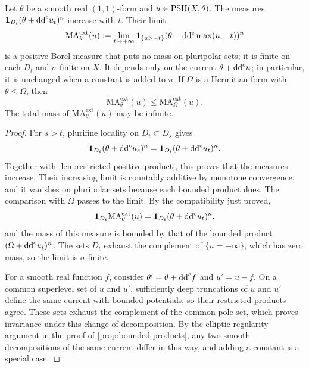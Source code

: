 \begin{theorem}\label{thm:arbitrary-extended-ma}\label{prop:extended-measure}
Let $\theta$ be a smooth real $(1,1)$-form and $u\in\mathrm{PSH}(X,\theta)$. The measures $\mathbf1_{D_t}(\theta+\mathrm{dd}^{\mathrm{c}} u_t)^n$ increase with $t$. Their limit
\begin{equation}\label{eq:extended-ma}
 \mathrm{MA}^{\mathrm{ext}}_\theta(u)
 :=\lim_{t\to+\infty}\mathbf1_{\{u>-t\}}
       (\theta+\mathrm{dd}^{\mathrm{c}}\max(u,-t))^n
\end{equation}
is a positive Borel measure that puts no mass on pluripolar sets; it is finite on each $D_t$ and $\sigma$-finite on $X$. It depends only on the current $\theta+\mathrm{dd}^{\mathrm{c}} u$; in particular, it is unchanged when a constant is added to $u$. If $\Omega$ is a Hermitian form with $\theta\leq\Omega$, then
\[
 \mathrm{MA}^{\mathrm{ext}}_\theta(u)
 \leq\mathrm{MA}^{\mathrm{ext}}_\Omega(u).
\]
The total mass of $\mathrm{MA}^{\mathrm{ext}}_\theta(u)$ may be infinite.
\end{theorem}
\begin{proof}
For $s>t$, plurifine locality on $D_t\subset D_s$ gives
\[
 \mathbf1_{D_t}(\theta+\mathrm{dd}^{\mathrm{c}} u_s)^n
 =\mathbf1_{D_t}(\theta+\mathrm{dd}^{\mathrm{c}} u_t)^n.
\]
Together with \cref{lem:restricted-positive-product}, this proves that the measures increase. Their increasing limit is countably additive by monotone convergence, and it vanishes on pluripolar sets because each bounded product does. The comparison with $\Omega$ passes to the limit. By the compatibility just proved,
\[
 \mathbf1_{D_t}\mathrm{MA}^{\mathrm{ext}}_\theta(u)
 =\mathbf1_{D_t}(\theta+\mathrm{dd}^{\mathrm{c}} u_t)^n,
\]
and the mass of this measure is bounded by that of the bounded product $(\Omega+\mathrm{dd}^{\mathrm{c}} u_t)^n$. The sets $D_t$ exhaust the complement of $\{u=-\infty\}$, which has zero mass, so the limit is $\sigma$-finite.

For a smooth real function $f$, consider $\theta'=\theta+\mathrm{dd}^{\mathrm{c}} f$ and $u'=u-f$. On a common superlevel set of $u$ and $u'$, sufficiently deep truncations of $u$ and $u'$ define the same current with bounded potentials, so their restricted products agree. These sets exhaust the complement of the common pole set, which proves invariance under this change of decomposition. By the elliptic-regularity argument in the proof of \cref{prop:bounded-products}, any two smooth decompositions of the same current differ in this way, and adding a constant is a special case.
\end{proof}

